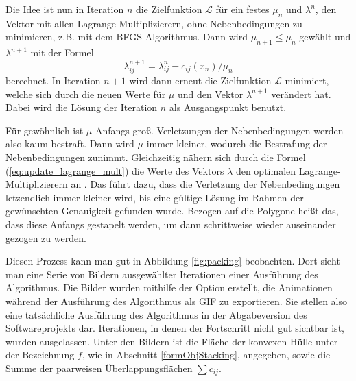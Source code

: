 \documentclass[runningheads,a4paper]{llncs}
\begin{document}
Die Idee ist nun in Iteration $n$ die Zielfunktion $\mathcal{L}$ für ein festes $\mu_n$ und $\lambda^n$, den Vektor mit allen Lagrange-Multiplizierern, ohne Nebenbedingungen zu minimieren, z.B. mit dem BFGS-Algorithmus. Dann wird ${\mu_{n+1} \le \mu_n}$ gewählt und $\lambda^{n+1}$ mit der Formel
\begin{equation}
\label{eq:update_lagrange_mult}
\lambda_{ij}^{n+1} = \lambda_{ij}^n - c_{ij}(x_n)/\mu_n 
\end{equation}
berechnet.
In Iteration $n+1$ wird dann erneut die Zielfunktion $\mathcal{L}$ minimiert, welche sich durch die neuen Werte für $\mu$ und den Vektor $\lambda^{n+1}$ verändert hat. Dabei wird die Lösung der Iteration $n$ als Ausgangspunkt benutzt.

Für gewöhnlich ist $\mu$ Anfangs groß. Verletzungen der Nebenbedingungen werden also kaum bestraft. Dann wird $\mu$ immer kleiner, wodurch die Bestrafung der Nebenbedingungen zunimmt. Gleichzeitig nähern sich durch die Formel (\ref{eq:update_lagrange_mult}) die Werte des Vektors $\lambda$ den optimalen Lagrange-Multiplizierern an \cite{nocedal1999numerical}. Das führt dazu, dass die Verletzung der Nebenbedingungen letzendlich immer kleiner wird, bis eine gültige Lösung im Rahmen der gewünschten Genauigkeit gefunden wurde. Bezogen auf die Polygone heißt das, dass diese Anfangs gestapelt werden, um dann schrittweise wieder auseinander gezogen zu werden.

Diesen Prozess kann man gut in Abbildung \ref{fig:packing} beobachten. Dort sieht man eine Serie von Bildern ausgewählter Iterationen einer Ausführung des Algorithmus. Die Bilder wurden mithilfe der Option erstellt, die Animationen während der Ausführung des Algorithmus als GIF zu exportieren. Sie stellen also eine tatsächliche Ausführung des Algorithmus in der Abgabeversion des Softwareprojekts dar. Iterationen, in denen der Fortschritt nicht gut sichtbar ist, wurden ausgelassen. Unter den Bildern ist die Fläche der konvexen Hülle unter der Bezeichnung $f$, wie in Abschnitt \ref{formObjStacking}, angegeben, sowie die Summe der paarweisen Überlappungsflächen $\sum c_{ij}$.
\end{document}
